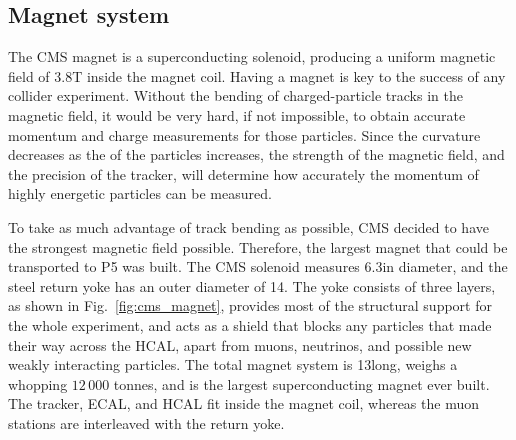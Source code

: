 
\subsection{Magnet system \label{sec:cms_magnet}}

The CMS magnet is a superconducting solenoid, producing a uniform magnetic field of 3.8\unit{T}
inside the magnet coil. 
Having a magnet is key to the success of any collider experiment. Without the bending of
charged-particle tracks in the magnetic field, it would be very hard, if not impossible, to obtain
accurate momentum and charge measurements for those particles. 
Since the curvature decreases as the \pt of the particles increases, the strength of the magnetic
field, and the precision of the tracker, will determine how accurately the momentum of highly
energetic particles can be measured. 

To take as much advantage of track bending as possible, CMS decided to have the strongest magnetic
field possible. Therefore, the largest magnet that could be transported to P5 was built. The CMS
solenoid measures 6.3\meter in diameter, and the steel return yoke has an outer diameter of
14\meter. 
The yoke consists of three layers, as shown in Fig.~\ref{fig:cms_magnet},
provides most of the structural support for the whole experiment, and acts as a shield that blocks
any particles that made their way across the HCAL, apart from muons, neutrinos, and possible new
weakly interacting particles.
The total magnet system is 13\meter long, weighs a whopping $12\,000$ tonnes,
and is the largest superconducting magnet ever built. 
The tracker, ECAL, and HCAL fit inside the magnet coil, whereas the muon stations are interleaved
with the return yoke.  

